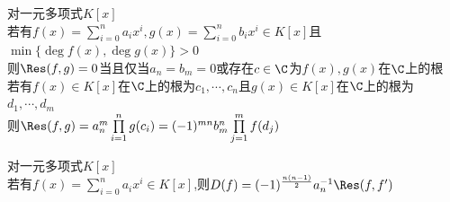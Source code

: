 \begin{dingli}
对一元多项式$K[x]$\\
若有$f(x)=\sum\limits_{i=0}^{n}a_ix^i,g(x)=\sum\limits_{i=0}^{n}b_ix^i\in K[x]$且$\min\{\deg f(x),\deg g(x)\}>0$\\
则$\Res(f,g)=0$当且仅当$a_n=b_m=0$或存在$c\in\C$为$f(x),g(x)$在$\C$上的根\\
若有$f(x)\in K[x]$在$\C$上的根为$c_1,\cdots,c_n$且$g(x)\in K[x]$在$\C$上的根为$d_1,\cdots,d_m$\\
则$\Res(f,g)=a_n^m\prod\limits_{i=1}^{n}g(c_i)=(-1)^{mn}b_m^n\prod\limits_{j=1}^{m}f(d_j)$
\end{dingli}

\begin{dingli}
对一元多项式$K[x]$\\
若有$f(x)=\sum\limits_{i=0}^{n}a_ix^i\in K[x]$,则$D(f)=(-1)^{\frac{n(n-1)}{2}}a_n^{-1}\Res(f,f')$
\end{dingli}


%